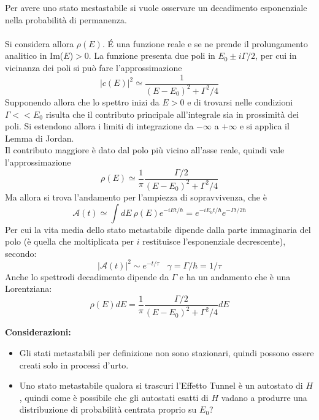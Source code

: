 \documentclass[twoside]{article}
\begin{document}
Per avere uno stato mestastabile si vuole osservare un decadimento esponenziale nella probabilità di permanenza.
\\
\\
Si considera allora $\rho(E)$. \'E una funzione reale e se ne prende il prolungamento analitico in Im($E$)$>0$. La funzione presenta due poli in $E_0 \pm i\Gamma/2$, per cui in vicinanza dei poli si può fare l'approssimazione
\begin{equation}
    |c(E)|^2\simeq\frac{1}{(E-E_0)^2 + \Gamma^2 /4}
\end{equation}
Supponendo allora che lo spettro inizi da $E>0$ e di trovarsi nelle condizioni $\Gamma << E_0$ risulta che il contributo principale all'integrale sia in prossimità dei poli. Si estendono allora i limiti di integrazione da $-\infty$ a $+\infty$ e si applica il Lemma di Jordan.
\\
Il contributo maggiore è dato dal polo più vicino all'asse reale, quindi vale l'approssimazione
\begin{equation}
    \rho(E)\simeq \frac{1}{\pi}\frac{\Gamma/2}{(E-E_0)^2 + \Gamma ^2 /4}
\end{equation}
Ma allora si trova l'andamento per l'ampiezza di sopravvivenza, che è
\begin{equation}
    \mathcal{A}(t) \simeq \int dE \ \rho (E) e^{-iEt/\hbar} = e^{-iE_0 t /\hbar} e^{-\Gamma t / 2\hbar}
\end{equation}
Per cui la vita media dello stato metastabile dipende dalla parte immaginaria del polo (è quella che moltiplicata per $i$ restituisce l'esponenziale decrescente), secondo:
\begin{equation}
    |\mathcal{A}(t)|^2 \sim e^{-t/\tau} \ \ \ \ \gamma=\Gamma/\hbar=1/\tau
\end{equation}
Anche lo spettrodi decadimento dipende da $\Gamma$ e ha un andamento che è una Lorentziana:
\begin{equation}
    \rho(E) dE = \frac{1}{\pi}\frac{\Gamma/2}{(E-E_0)^2+\Gamma ^2 /4} dE
\end{equation}

\textbf{Considerazioni:}
\begin{itemize}
    \item Gli stati metastabili per definizione non sono stazionari, quindi possono essere creati solo in processi d'urto.
    \item Uno stato metastabile qualora si trascuri l'Effetto Tunnel è un autostato di $H$, quindi come è possibile che gli autostati esatti di $H$ vadano a produrre una distribuzione di probabilità centrata proprio su $E_0$?
\end{itemize}
\end{document}
